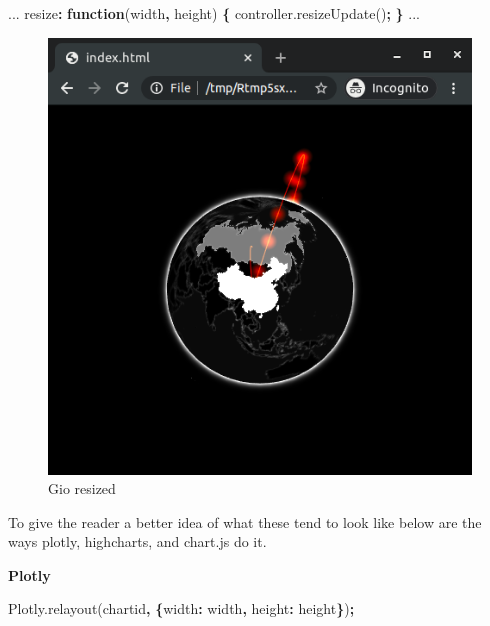 \documentclass[
]{krantz}
\makeatletter
\newenvironment{Shaded}{\begin{snugshade}}{\end{snugshade}}
\newcommand{\AttributeTok}[1]{\textcolor[rgb]{0.61,0.61,0.61}{#1}}
\newcommand{\DataTypeTok}[1]{\textcolor[rgb]{0.27,0.27,0.27}{#1}}
\newcommand{\KeywordTok}[1]{\textcolor[rgb]{0.27,0.27,0.27}{\textbf{#1}}}
\newcommand{\NormalTok}[1]{#1}
\newcommand{\OperatorTok}[1]{\textcolor[rgb]{0.43,0.43,0.43}{\textbf{#1}}}
\newcommand{\StringTok}[1]{\textcolor[rgb]{0.5,0.5,0.5}{#1}}
\newcommand{\VariableTok}[1]{\textcolor[rgb]{0,0,0}{#1}}
\newenvironment{kframe}{%
\medskip{}
\setlength{\fboxsep}{.8em}
 \def\at@end@of@kframe{}%
 \ifinner\ifhmode%
  \def\at@end@of@kframe{\end{minipage}}%
  \begin{minipage}{\columnwidth}%
 \fi\fi%
 \def\FrameCommand##1{\hskip\@totalleftmargin \hskip-\fboxsep
 \colorbox{shadecolor}{##1}\hskip-\fboxsep
     \hskip-\linewidth \hskip-\@totalleftmargin \hskip\columnwidth}%
 \MakeFramed {\advance\hsize-\width
   \@totalleftmargin\z@ \linewidth\hsize
   \@setminipage}}%
 {\par\unskip\endMakeFramed%
 \at@end@of@kframe}
\renewenvironment{Shaded}{\begin{kframe}}{\end{kframe}}
\makeatother
\begin{document}
\begin{Shaded}
\begin{Highlighting}[]
\NormalTok{...}
\NormalTok{resize}\OperatorTok{:} \KeywordTok{function}\NormalTok{(width}\OperatorTok{,}\NormalTok{ height) }\OperatorTok{\{}
  \VariableTok{controller}\NormalTok{.}\AttributeTok{resizeUpdate}\NormalTok{()}\OperatorTok{;}
\OperatorTok{\}}
\NormalTok{...}
\end{Highlighting}
\end{Shaded}

\begin{figure}[t]

{\centering \includegraphics[width=1\linewidth]{images/gio-small} 

}

\caption{Gio resized}\label{fig:gio-small}
\end{figure}

To give the reader a better idea of what these tend to look like below are the ways plotly, highcharts, and chart.js do it.

\textbf{Plotly}

\begin{Shaded}
\begin{Highlighting}[]
\VariableTok{Plotly}\NormalTok{.}\AttributeTok{relayout}\NormalTok{(}\StringTok{\textquotesingle{}chartid\textquotesingle{}}\OperatorTok{,} \OperatorTok{\{}\DataTypeTok{width}\OperatorTok{:}\NormalTok{ width}\OperatorTok{,} \DataTypeTok{height}\OperatorTok{:}\NormalTok{ height}\OperatorTok{\}}\NormalTok{)}\OperatorTok{;}
\end{Highlighting}
\end{Shaded}
\end{document}
